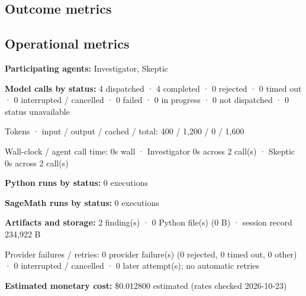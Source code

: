 \documentclass[11pt]{article}
\begin{document}
\subsection{Outcome metrics}
\subsection{Operational metrics}
\textbf{Participating agents:} Investigator, Skeptic\par
\textbf{Model calls by status:} 4 dispatched · 4 completed · 0 rejected · 0 timed out · 0 interrupted / cancelled · 0 failed · 0 in progress · 0 not dispatched · 0 status unavailable\par
Tokens · input / output / cached / total: 400 / 1,200 / 0 / 1,600\par
Wall-clock / agent call time: 0s wall · Investigator 0s across 2 call(s) · Skeptic 0s across 2 call(s)\par
\textbf{Python runs by status:} 0 executions\par
\textbf{SageMath runs by status:} 0 executions\par
\textbf{Artifacts and storage:} 2 finding(s) · 0 Python file(s) (0 B) · session record 234,922 B\par
Provider failures / retries: 0 provider failure(s) (0 rejected, 0 timed out, 0 other) · 0 interrupted / cancelled · 0 later attempt(s); no automatic retries\par
\textbf{Estimated monetary cost:} \$0.012800 estimated (rates checked 2026-10-23)\par
\end{document}

